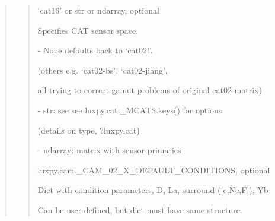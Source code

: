 \documentclass[letterpaper,10pt,english]{sphinxmanual}
\begin{document}
\begin{fulllineitems}
\begin{quote}
\begin{description}
\begin{quote}
\begin{description}
\item[{mcat}] \leavevmode
\begin{DUlineblock}{0em}
\item[] ‘cat16’ or str or ndarray, optional
\item[] Specifies CAT sensor space.
\item[]
\begin{DUlineblock}{\DUlineblockindent}
\item[] - None defaults back to ‘cat02!’. 
\item[]
\begin{DUlineblock}{\DUlineblockindent}
\item[] (others e.g. ‘cat02-bs’, ‘cat02-jiang’,
\item[] all trying to correct gamut problems of original cat02 matrix)
\end{DUlineblock}
\item[] - str: see see luxpy.cat.\_MCATS.keys() for options 
\item[]
\begin{DUlineblock}{\DUlineblockindent}
\item[] (details on type, ?luxpy.cat)
\end{DUlineblock}
\item[] - ndarray: matrix with sensor primaries
\end{DUlineblock}
\end{DUlineblock}

\item[{condition}] \leavevmode
\begin{DUlineblock}{0em}
\item[] luxpy.cam.\_CAM\_02\_X\_DEFAULT\_CONDITIONS, optional
\item[] Dict with condition parameters, D, La, surround ({[}c,Nc,F{]}), Yb
\item[] Can be user defined, but dict must have same structure.
\end{DUlineblock}


\end{description}
\end{quote}
\end{description}
\end{quote}
\end{fulllineitems}
\end{document}
